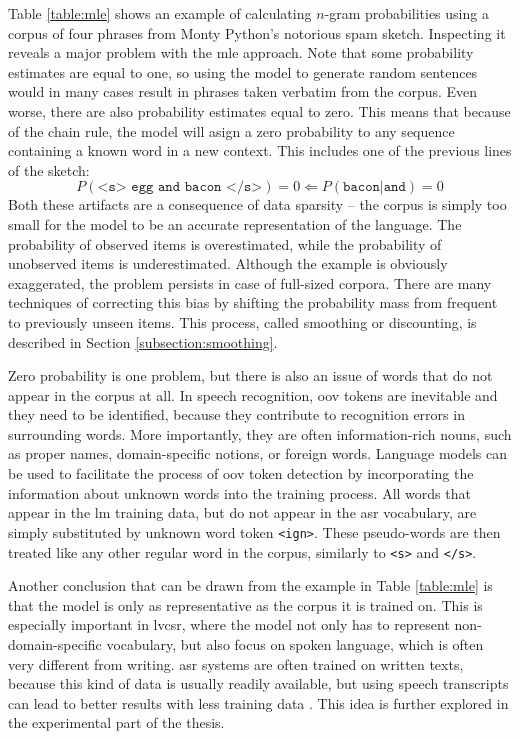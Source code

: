 	Table \ref{table:mle} shows an example of calculating \mbox{$n$-gram} probabilities using a corpus of four phrases from Monty Python's notorious spam sketch. Inspecting it reveals a major problem with the \gls{mle} approach. Note that some probability estimates are equal to one, so using the model to generate random sentences would in many cases result in phrases taken verbatim from the corpus. Even worse, there are also probability estimates equal to zero. This means that because of the chain rule, the model will asign a zero probability to any sequence containing a known word in a new context. This includes one of the previous lines of the sketch:
	\begin{equation}
		P(\texttt{<s> egg and bacon </s>})=0 \Leftarrow P(\texttt{bacon}|\texttt{and})=0
	\end{equation}
	Both these artifacts are a consequence of data sparsity -- the corpus is simply too small for the model to be an accurate representation of the language. The probability of observed items is overestimated, while the probability of unobserved items is underestimated. Although the example is obviously exaggerated, the problem persists in case of full-sized corpora. There are many techniques of correcting this bias by shifting the probability mass from frequent to previously unseen items. This process, called smoothing or discounting, is described in Section \ref{subsection:smoothing}. 

	Zero probability is one problem, but there is also an issue of words that do not appear in the corpus at all. In speech recognition, \gls{oov} tokens are inevitable and they need to be identified, because they contribute to recognition errors in surrounding words. More importantly, they are often information-rich nouns, such as proper names, domain-specific notions, or foreign words. Language models can be used to facilitate the process of \gls{oov} token detection by incorporating the information about unknown words into the training process. All words that appear in the \gls{lm} training data, but do not appear in the \gls{asr} vocabulary, are simply substituted by unknown word token \texttt{<ign>}. These pseudo-words are then treated like any other regular word in the corpus, similarly to \texttt{<s>} and \texttt{</s>}. 

	Another conclusion that can be drawn from the example in Table \ref{table:mle} is that the model is only as representative as the corpus it is trained on. This is especially important in \gls{lvcsr}, where the model not only has to represent non-domain-specific vocabulary, but also focus on spoken language, which is often very different from writing. \gls{asr} systems are often trained on written texts, because this kind of data is usually readily available, but using speech transcripts can lead to better results with less training data \cite{dziadzio2015comparison}. This idea is further explored in the experimental part of the thesis.

